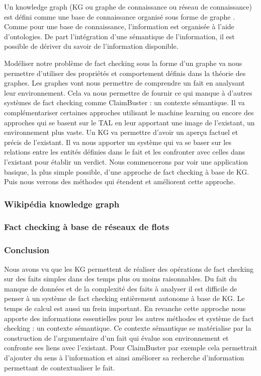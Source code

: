 Un knowledge graph (KG ou graphe de connaissance ou réseau de connaissance) est défini comme une base de connaissance organisé sous forme de graphe \cite{ehrlinger2016towards} \cite{JoStichburyKG}. Comme pour une base de connaissance, l'information est organisée à l'aide d'ontologies. De part l'intégration d'une sémantique de l'information, il est possible de dériver du savoir de l'information disponible. 

Modéliser notre problème de fact checking sous la forme d'un graphe va nous permettre d'utiliser des propriétés et comportement définis dans la théorie des graphes. Les graphes vont nous permettre de comprendre un fait en analysant leur environnement. Cela va nous permettre de fournir ce qui manque à d'autres systèmes de fact checking comme ClaimBuster : un contexte sémantique. Il va complémentariser certaines approches utilisant le machine learning ou encore des approches qui se basent sur le TAL en leur apportant une image de l'existant, un environnement plus vaste. Un KG va permettre d'avoir un aperçu factuel et précis de l'existant. Il va nous apporter un système qui va se baser sur les relations entre les entités définies dans le fait et les confronter avec celles dans l'existant pour établir un verdict. 
Nous commencerons par voir une application basique, la plus simple possible, d'une approche de fact checking à base de KG. Puis nous verrons des méthodes qui étendent et améliorent cette approche.

\subsubsection{Wikipédia knowledge graph}


\label{sec:wkg}

\subsubsection{Fact checking à base de réseaux de flots} 



\subsubsection{Conclusion}

Nous avons vu que les KG permettent de réaliser des opérations de fact checking sur des faits simples dans des temps plus ou moins raisonnables. Du fait du manque de données et de la complexité des faits à analyser il est difficile de penser à un système de fact checking entièrement autonome à base de KG. Le temps de calcul est aussi un frein important. En revanche cette approche nous apporte des informations essentielles pour les autres méthodes et système de fact checking : un contexte sémantique. Ce contexte sémantique se matérialise par la construction de l'argumentaire d'un fait qui évalue son environnement et confronte ses liens avec l'existant. Pour ClaimBuster par exemple cela permettrait d'ajouter du sens à l'information et ainsi améliorer sa recherche d'information permettant de contextualiser le fait.

